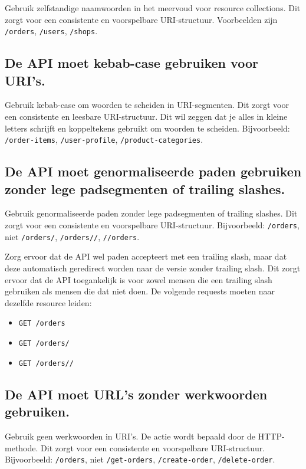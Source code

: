 Gebruik zelfstandige naamwoorden in het meervoud voor resource collections. Dit zorgt voor een consistente en voorspelbare URI-structuur. Voorbeelden zijn \texttt{/orders}, \texttt{/users}, \texttt{/shops}.

\subsection{De API moet kebab-case gebruiken voor URI's.}
\label{section:kebab_case_uris}

Gebruik kebab-case om woorden te scheiden in URI-segmenten. Dit zorgt voor een consistente en leesbare URI-structuur. Dit wil zeggen dat je alles in kleine letters schrijft en koppeltekens gebruikt om woorden te scheiden. Bijvoorbeeld: \texttt{/order-items}, \texttt{/user-profile}, \texttt{/product-categories}.

\subsection{De API moet genormaliseerde paden gebruiken zonder lege padsegmenten of trailing slashes.}
\label{section:genormaliseerde_paden}

Gebruik genormaliseerde paden zonder lege padsegmenten of trailing slashes. Dit zorgt voor een consistente en voorspelbare URI-structuur. Bijvoorbeeld: \texttt{/orders}, niet \texttt{/orders/}, \texttt{/orders//}, \texttt{//orders}.

Zorg ervoor dat de API wel paden accepteert met een trailing slash, maar dat deze automatisch geredirect worden naar de versie zonder trailing slash. Dit zorgt ervoor dat de API toegankelijk is voor zowel mensen die een trailing slash gebruiken als mensen die dat niet doen. De volgende requests moeten naar dezelfde resource leiden:

\begin{itemize}
    \item \texttt{GET /orders}
    \item \texttt{GET /orders/}
    \item \texttt{GET /orders//}
\end{itemize}

\subsection{De API moet URL's zonder werkwoorden gebruiken.}
\label{section:geen_werkwoorden_urls}

Gebruik geen werkwoorden in URI's. De actie wordt bepaald door de HTTP-methode. Dit zorgt voor een consistente en voorspelbare URI-structuur. Bijvoorbeeld: \texttt{/orders}, niet \texttt{/get-orders}, \texttt{/create-order}, \texttt{/delete-order}.

